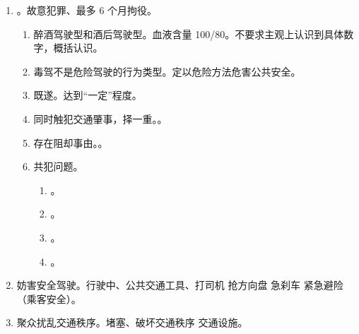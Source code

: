 \begin{enumerate}
\begin{enumerate}
\begin{enumerate}
                  \item 共犯。
                        \begin{enumerate}
                          \item 共同过失肇事。。
                          \item 指使逃逸。。
                                指使逃逸的人是单位主管人员、车辆所有人、承包人、乘车人定交通肇事罪共犯。
                        \end{enumerate}
                \end{enumerate}
          \item {}。故意犯罪、最多 6 个月拘役。
                \begin{enumerate}
                  \item 醉酒驾驶型和酒后驾驶型。血液含量 100/80。不要求主观上认识到具体数字，概括认识。
                  \item 毒驾不是危险驾驶的行为类型。定以危险方法危害公共安全。
                  \item 既遂。达到“一定”程度。
                  \item 同时触犯交通肇事，择一重。。
                  \item 存在阻却事由。。
                  \item 共犯问题。
                        \begin{enumerate}
                          \item {}。
                          \item {}。
                          \item {}。
                          \item {}。
                        \end{enumerate}
                \end{enumerate}
          \item 妨害安全驾驶。行驶中、公共交通工具、打司机 \hz 抢方向盘 \yjt 急刹车 \yjt 紧急避险（乘客安全）。
          \item 聚众扰乱交通秩序。堵塞、破坏交通秩序 \bdy 交通设施。
        \end{enumerate}
\end{enumerate}
